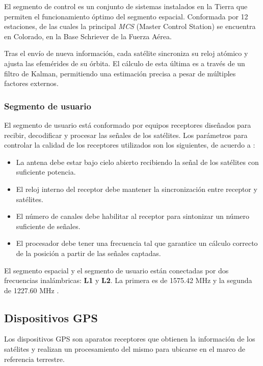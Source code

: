 El segmento de control es un conjunto de sistemas instalados en la Tierra que permiten el funcionamiento óptimo del segmento espacial. Conformada por 12 estaciones, de las cuales la principal \textit{MCS} (Master Control Station\footnotemark) se encuentra en Colorado, en la Base Schriever de la Fuerza Aérea.\\


Tras el envío de nueva información, cada satélite sincroniza su reloj atómico y ajusta las efemérides de su órbita. El cálculo de esta última es a través de un filtro de Kalman, permitiendo una estimación precisa a pesar de múltiples factores externos.

\subsubsection{Segmento de usuario}

El segmento de usuario está conformado por equipos receptores diseñados para recibir, decodificar y procesar las señales de los satélites. Los parámetros para controlar la calidad de los receptores utilizados son los siguientes, de acuerdo a \citep{termal2014prototipo}:

\begin{itemize}
	\item La antena debe estar bajo cielo abierto recibiendo la señal de los satélites con suficiente potencia.
	\item El reloj interno del receptor debe mantener la sincronización entre receptor y satélites.
	\item El número de canales debe habilitar al receptor para sintonizar un número suficiente de señales.
	\item El procesador debe tener una frecuencia tal que garantice un cálculo correcto de la posición a partir de las señales captadas.	
\end{itemize}

El segmento espacial y el segmento de usuario están conectadas por dos frecuencias inalámbricas: \textbf{L1} y \textbf{L2}. La primera es de 1575.42 MHz y la segunda de 1227.60 MHz \citep{farrell2008aided}.

\subsection{Dispositivos GPS}
Los dispositivos GPS son aparatos receptores que obtienen la información de los satélites y realizan un procesamiento del mismo para ubicarse en el marco de referencia terrestre. \\

